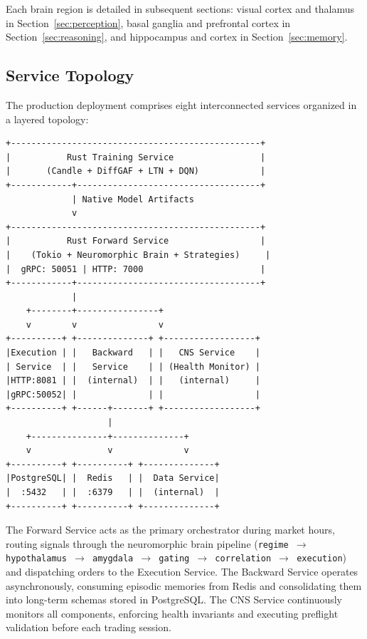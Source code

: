 \documentclass[12pt, a4paper]{article}
\begin{document}
Each brain region is detailed in subsequent sections: visual cortex and thalamus in Section~\ref{sec:perception}, basal ganglia and prefrontal cortex in Section~\ref{sec:reasoning}, and hippocampus and cortex in Section~\ref{sec:memory}.

\subsection{Service Topology}
\label{sec:topology}

The production deployment comprises eight interconnected services organized in a layered topology:

\begin{tcolorbox}[colback=codegray, colframe=rustcolor, title=System Architecture (Pure Rust)]
	\begin{verbatim}
+-------------------------------------------------+
|           Rust Training Service                 |
|       (Candle + DiffGAF + LTN + DQN)            |
+------------+------------------------------------+
             | Native Model Artifacts
             v
+-------------------------------------------------+
|           Rust Forward Service                  |
|    (Tokio + Neuromorphic Brain + Strategies)     |
|  gRPC: 50051 | HTTP: 7000                       |
+------------+------------------------------------+
             |
    +--------+----------------+
    v        v                v
+----------+ +--------------+ +------------------+
|Execution | |   Backward   | |   CNS Service    |
| Service  | |   Service    | | (Health Monitor) |
|HTTP:8081 | |  (internal)  | |   (internal)     |
|gRPC:50052| |              | |                  |
+----------+ +------+-------+ +------------------+
                    |
    +---------------+--------------+
    v               v              v
+----------+ +----------+ +--------------+
|PostgreSQL| |  Redis   | |  Data Service|
|  :5432   | |  :6379   | |  (internal)  |
+----------+ +----------+ +--------------+
	\end{verbatim}
\end{tcolorbox}

The Forward Service acts as the primary orchestrator during market hours, routing signals through the neuromorphic brain pipeline (\texttt{regime $\to$ hypothalamus $\to$ amygdala $\to$ gating $\to$ correlation $\to$ execution}) and dispatching orders to the Execution Service. The Backward Service operates asynchronously, consuming episodic memories from Redis and consolidating them into long-term schemas stored in PostgreSQL. The CNS Service continuously monitors all components, enforcing health invariants and executing preflight validation before each trading session.
\end{document}
